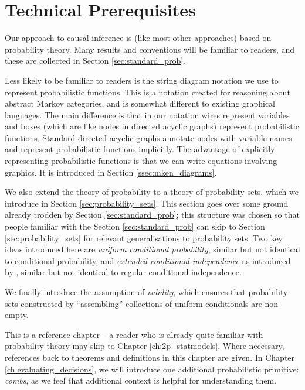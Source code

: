 

\chapter{Technical Prerequisites}\label{ch:tech_prereq}

Our approach to causal inference is (like most other approaches) based on probability theory. Many results and conventions will be familiar to readers, and these are collected in Section \ref{sec:standard_prob}.

Less likely to be familiar to readers is the string diagram notation we use to represent probabilistic functions. This is a notation created for reasoning about abstract Markov categories, and is somewhat different to existing graphical languages. The main difference is that in our notation wires represent variables and boxes (which are like nodes in directed acyclic graphs) represent probabilistic functions. Standard directed acyclic graphs annotate nodes with variable names and represent probabilistic functions implicitly. The advantage of explicitly representing probabilistic functions is that we can write equations involving graphics. It is introduced in Section \ref{ssec:mken_diagrams}.

We also extend the theory of probability to a theory of probability sets, which we introduce in Section \ref{sec:probability_sets}. This section goes over some ground already trodden by Section \ref{sec:standard_prob}; this structure was chosen so that people familiar with the Section \ref{sec:standard_prob} can skip to Section \ref{sec:probability_sets} for relevant generalisations to probability sets. Two key ideas introduced here are \emph{uniform conditional probability}, similar but not identical to conditional probability, and \emph{extended conditional independence} as introduced by \citet{constantinou_extended_2017}, similar but not identical to regular conditional independence.

We finally introduce the assumption of \emph{validity}, which ensures that probability sets constructed by ``assembling'' collections of uniform conditionals are non-empty.

This is a reference chapter -- a reader who is already quite familiar with probability theory may skip to Chapter \ref{ch:2p_statmodels}. Where necessary, references back to theorems and definitions in this chapter are given. In Chapter \ref{ch:evaluating_decisions}, we will introduce one additional probabilistic primitive: \emph{combs}, as we feel that additional context is helpful for understanding them.

